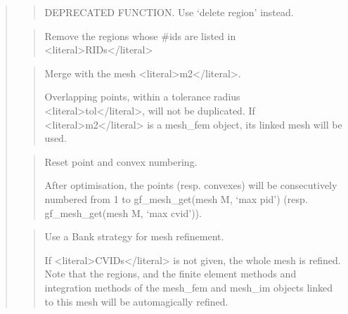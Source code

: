 \documentclass[a4paper,11pt,english]{sphinxmanual}
\begin{document}
\begin{quote}
\begin{quote}
\sphinxAtStartPar
DEPRECATED FUNCTION. Use ‘delete region’ instead.
\end{quote}

\sphinxAtStartPar
{}
\begin{quote}

\sphinxAtStartPar
Remove the regions whose \#ids are listed in \textless{}literal\textgreater{}RIDs\textless{}/literal\textgreater{}
\end{quote}

\sphinxAtStartPar
{}
\begin{quote}

\sphinxAtStartPar
Merge with the mesh \textless{}literal\textgreater{}m2\textless{}/literal\textgreater{}.

\sphinxAtStartPar
Overlapping points, within a tolerance radius \textless{}literal\textgreater{}tol\textless{}/literal\textgreater{}, will not be
duplicated. If \textless{}literal\textgreater{}m2\textless{}/literal\textgreater{} is a mesh\_fem object, its linked mesh will be used.
\end{quote}

\sphinxAtStartPar
{}
\begin{quote}

\sphinxAtStartPar
Reset point and convex numbering.

\sphinxAtStartPar
After optimisation, the points (resp. convexes) will
be consecutively numbered from 1 to gf\_mesh\_get(mesh M, ‘max pid’)
(resp. gf\_mesh\_get(mesh M, ‘max cvid’)).
\end{quote}

\sphinxAtStartPar
{}
\begin{quote}

\sphinxAtStartPar
Use a Bank strategy for mesh refinement.

\sphinxAtStartPar
If \textless{}literal\textgreater{}CVIDs\textless{}/literal\textgreater{} is not given, the whole mesh is refined. Note
that the regions, and the finite element methods and
integration methods of the mesh\_fem and mesh\_im objects linked
to this mesh will be automagically refined.
\end{quote}
\end{quote}
\end{document}
